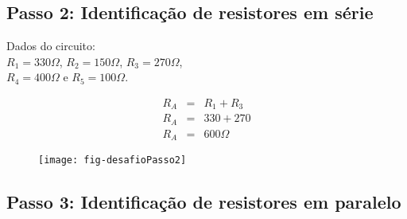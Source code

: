\subsection{Passo 2: Identificação de resistores em série}

\begin{minipage}{\linewidth}
  \centering
  \begin{minipage}{0.45\linewidth}
    Dados do circuito: \\
                $R_1 = 330\Omega$,
                $R_2 = 150\Omega$,
                $R_3 = 270\Omega$, \\
                $R_4 = 400\Omega$ e
                $R_5 = 100\Omega$.

      \begin{eqnarray}
        R_A & = & R_1 + R_3 \nonumber\\
        R_A & = & 330 + 270 \nonumber\\
        R_A & = & 600\Omega \nonumber
      \end{eqnarray}

  \end{minipage}
  \hspace{0.05\linewidth}
  \begin{minipage}{0.45\linewidth}
    \begin{figure}[H]
      \centering
      \texttt{[image: fig-desafioPasso2]}
    \end{figure}
  \end{minipage}
\end{minipage}







\subsection{Passo 3: Identificação de resistores em paralelo}

